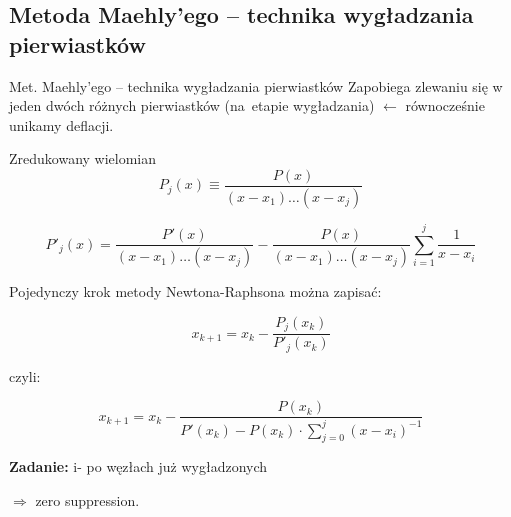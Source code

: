 \subsection{Metoda Maehly'ego -- technika wygładzania pierwiastków}

\begin{frame}{Met. Maehly'ego -- technika wygładzania pierwiastków}
  Zapobiega zlewaniu się w jeden dwóch różnych pierwiastków (na~etapie wygładzania) $\leftarrow$ równocześnie unikamy deflacji.

  \begin{block}{Zredukowany wielomian}
    $$P_j(x) \equiv \frac{P(x)}{(x - x_1)\ldots(x - x_j)}$$
  \end{block}

  $$P'_j(x) = \frac{P'(x)}{(x - x_1)\ldots(x - x_j)} - \frac{P(x)}{(x - x_1)\ldots(x - x_j)} \sum_{i=1}^j \frac{1}{x - x_i}$$
\end{frame}

\begin{frame}
  Pojedynczy krok metody Newtona-Raphsona można zapisać:

  $$x_{k+1} = x_k - \frac{P_j(x_k)}{P'_j(x_k)}$$

  czyli:

  $$x_{k+1} = x_k - \frac{P(x_k)}{P'(x_k) - P(x_k) \cdot \sum_{j=0}^j(x - x_i)^{-1}}$$ %

  \textbf{Zadanie:} i- po węzłach już wygładzonych %

  $\Rightarrow$ zero suppression.
\end{frame}
